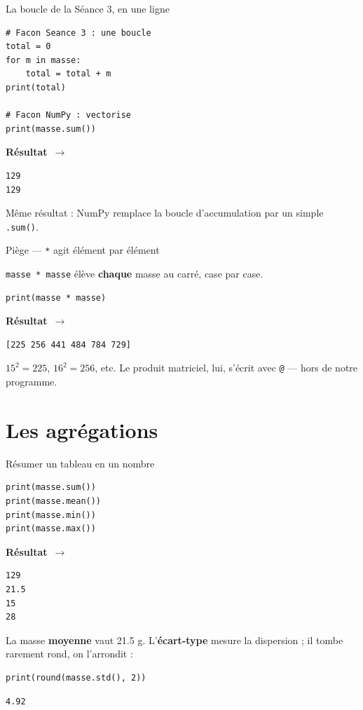 \documentclass[aspectratio=169,11pt]{beamer}
\newcommand{\resultat}{{\scriptsize\textbf{R\'esultat}~$\rightarrow$}\par\vspace{1pt}}
\begin{document}
\begin{frame}[fragile]{La boucle de la Séance 3, en une ligne}
\begin{lstlisting}
# Facon Seance 3 : une boucle
total = 0
for m in masse:
    total = total + m
print(total)

# Facon NumPy : vectorise
print(masse.sum())
\end{lstlisting}
\resultat
\begin{lstlisting}[style=out]
129
129
\end{lstlisting}
{\small Même résultat : NumPy remplace la boucle d'accumulation par un simple \texttt{.sum()}.}
\end{frame}

\begin{frame}[fragile]{Piège — \texttt{*} agit élément par élément}
\begin{ucadpiege}
{\small \texttt{masse * masse} élève \textbf{chaque} masse au carré, case par case.}
\end{ucadpiege}
\begin{lstlisting}
print(masse * masse)
\end{lstlisting}
\resultat
\begin{lstlisting}[style=out]
[225 256 441 484 784 729]
\end{lstlisting}
{\small $15^2 = 225$, $16^2 = 256$, etc. Le produit matriciel, lui, s'écrit avec \texttt{@} — hors de notre programme.}
\end{frame}

\section{Les agrégations}

\begin{frame}[fragile]{Résumer un tableau en un nombre}
\begin{lstlisting}
print(masse.sum())
print(masse.mean())
print(masse.min())
print(masse.max())
\end{lstlisting}
\resultat
\begin{lstlisting}[style=out]
129
21.5
15
28
\end{lstlisting}
{\small La masse \textbf{moyenne} vaut 21.5 g. L'\textbf{écart-type} mesure la dispersion ; il tombe rarement rond, on l'arrondit :}
\begin{lstlisting}
print(round(masse.std(), 2))
\end{lstlisting}
\begin{lstlisting}[style=out]
4.92
\end{lstlisting}
\end{frame}
\end{document}
